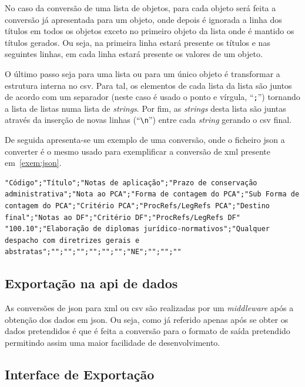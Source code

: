 No caso da conversão de uma lista de objetos, para cada objeto será feita a conversão já apresentada para um objeto, onde depois é ignorada a linha dos títulos em todos os objetos exceto no primeiro objeto da lista onde é mantido os títulos gerados. Ou seja, na primeira linha estará presente os títulos e nas seguintes linhas, em cada linha estará presente os valores de um objeto.

O último passo seja para uma lista ou para um único objeto é transformar a estrutura interna no \acrshort{csv}. Para tal, os elementos de cada lista da lista são juntos de acordo com um separador (neste caso é usado o ponto e vírgula, ``\texttt{;}'') tornando a lista de listas numa lista de \textit{strings}. Por fim, as \textit{strings} desta lista são juntas através da inserção de novas linhas (``\texttt{\textbackslash{}n}'') entre cada \textit{string} gerando o \acrshort{csv} final.

De seguida apresenta-se um exemplo de uma conversão, onde o ficheiro \acrshort{json} a converter é o mesmo usado para exemplificar a conversão de \acrshort{xml} presente em~\ref{exem:json}.

\begin{lstlisting}[language=pseudocode, caption=\acrshort{csv} resultante da conversão do \acrshort{json} presente em~\ref{exem:json}]
"Código";"Título";"Notas de aplicação";"Prazo de conservação administrativa";"Nota ao PCA";"Forma de contagem do PCA";"Sub Forma de contagem do PCA";"Critério PCA";"ProcRefs/LegRefs PCA";"Destino final";"Notas ao DF";"Critério DF";"ProcRefs/LegRefs DF"
"100.10";"Elaboração de diplomas jurídico-normativos";"Qualquer despacho com diretrizes gerais e abstratas";"";"";"";"";"";"";"NE";"";"";""
\end{lstlisting}

\subsection{Exportação na \acrshort{api} de dados}

As conversões de \acrshort{json} para \acrshort{xml} ou \acrshort{csv} são realizadas por um \textit{middleware} após a obtenção dos dados em \acrshort{json}. Ou seja, como já referido apenas após se obter os dados pretendidos é que é feita a conversão para o formato de saída pretendido permitindo assim uma maior facilidade de desenvolvimento.

\subsection{Interface de Exportação}

